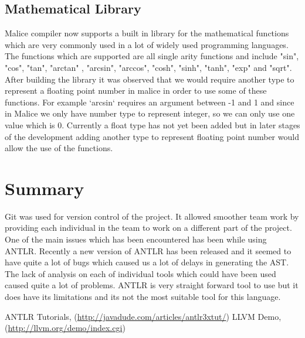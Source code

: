 \documentclass[a4wide, 11pt]{article}
\begin{document}
	\subsection{Mathematical Library}
		Malice compiler now supports a built in library for the mathematical functions which are very commonly 
		used in a lot of widely
		used programming languages. The functions which are supported are all single arity functions and 
		include "sin", "cos", "tan", "arctan"
		, "arcsin", "arccos", "cosh", "sinh", "tanh", "exp" and "sqrt". After building the library it
		 was observed that we would require 
		another type to represent a floating point number in malice in order to use some of these functions. 
		For example `arcsin` requires an
		argument between -1 and 1 and since in Malice we only have number type to represent integer, 
		so we can only use one value which is
		0. Currently a float type has not yet been added but in later stages of the development 
		adding another type to represent floating
		point number would allow the use of the functions.
		
		
\section{Summary}
	Git was used for version control of the project. It allowed smoother team work by providing each individual in the
	team to work on a different part of the project. One of the main issues which has been encountered has been 
	while using ANTLR. Recently a new version of ANTLR has been released and it seemed to have quite a lot of bugs 
	which caused us a lot of delays in generating the AST. The lack of analysis on each of individual tools which 
	could have been used caused quite a lot of problems. ANTLR is very straight
	forward tool to use but it does have its limitations and its not the most suitable tool for this language.

	
 \begin{thebibliography}{1}
	 ANTLR Tutorials, (\url{http://javadude.com/articles/antlr3xtut/})
  	 LLVM Demo, (\url{http://llvm.org/demo/index.cgi})
  \end{thebibliography}
\end{document}
